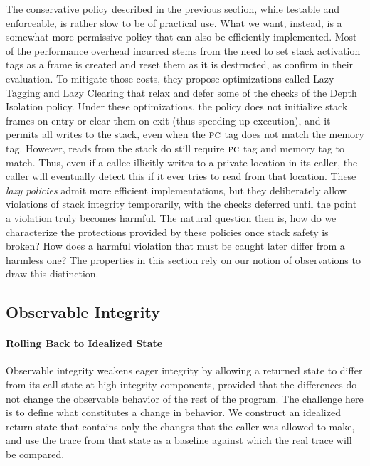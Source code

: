 \documentclass[acmsmall,review,anonymous]{acmart}\settopmatter{printfolios=true,printccs=false,printacmref=false}
\begin{document}
The conservative policy described in the previous section, while
testable and enforceable, is rather slow to be of practical use. What
we want, instead, is a somewhat more permissive policy that can also
be efficiently implemented. Most of the performance overhead incurred
stems from the need to set stack activation tags as a frame is created
and reset them as it is destructed, as
\citet{DBLP:conf/sp/RoesslerD18} confirm in their evaluation. To
mitigate those costs, they propose optimizations called Lazy Tagging and
Lazy Clearing that relax and defer some of the checks of the Depth Isolation
policy. Under these optimizations, the policy does not initialize stack
frames on entry or clear them on exit (thus speeding up execution),
and it permits all writes to the stack, even when the $\textsc{pc}$ tag
does not match the memory tag.
However, reads from the stack do still require $\textsc{pc}$ tag and memory tag
to match. Thus, even if a callee illicitly writes to a private location
in its caller, the caller will eventually detect this if it ever tries to read from
that location.
%
These \emph{lazy policies} admit more efficient implementations, but
they deliberately allow violations of stack integrity temporarily,
with the checks deferred until the point a violation truly becomes
harmful. The natural question then is, how do we characterize the
protections provided by these policies once stack safety is broken?
How does a harmful violation that must be caught later differ from a
harmless one? The properties in this section rely on our notion of
observations to draw this distinction.

\subsection{Observable Integrity}

\paragraph{Rolling Back to Idealized State}

Observable integrity weakens eager integrity by allowing a returned
state to differ from its call state at high integrity components,
provided that the differences do not change the observable behavior of
the rest of the program. The challenge here is to define what constitutes
a change in behavior. We construct an idealized return state that
contains only the changes that the caller was allowed to make, and use
the trace from that state as a baseline against which the real trace
will be compared.
\end{document}
